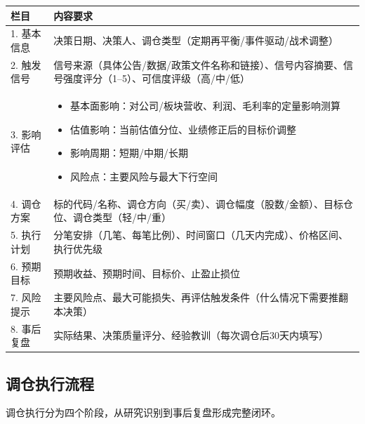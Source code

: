 \begin{exhibitbox}[表9-26：调仓决策日志模板]
\scriptsize
\setlength{\tabcolsep}{3pt}
\renewcommand{\arraystretch}{1.15}
\begin{tabularx}{\textwidth}{l X}
\toprule
\textbf{栏目} & \textbf{内容要求} \\
\midrule
1. 基本信息 & 决策日期、决策人、调仓类型（定期再平衡/事件驱动/战术调整） \\
\midrule
2. 触发信号 & 信号来源（具体公告/数据/政策文件名称和链接）、信号内容摘要、信号强度评分（1--5）、可信度评级（高/中/低） \\
\midrule
3. 影响评估 & 
\begin{itemize}[leftmargin=1.2em]
\item 基本面影响：对公司/板块营收、利润、毛利率的定量影响测算
\item 估值影响：当前估值分位、业绩修正后的目标价调整
\item 影响周期：短期/中期/长期
\item 风险点：主要风险与最大下行空间
\end{itemize}
\\
\midrule
4. 调仓方案 & 标的代码/名称、调仓方向（买/卖）、调仓幅度（股数/金额）、目标仓位、调仓类型（轻/中/重） \\
\midrule
5. 执行计划 & 分笔安排（几笔、每笔比例）、时间窗口（几天内完成）、价格区间、执行优先级 \\
\midrule
6. 预期目标 & 预期收益、预期时间、目标价、止盈止损位 \\
\midrule
7. 风险提示 & 主要风险点、最大可能损失、再评估触发条件（什么情况下需要推翻本决策） \\
\midrule
8. 事后复盘 & 实际结果、决策质量评分、经验教训（每次调仓后30天内填写） \\
\bottomrule
\end{tabularx}
\end{exhibitbox}

\subsection{调仓执行流程}

调仓执行分为四个阶段，从研究识别到事后复盘形成完整闭环。

